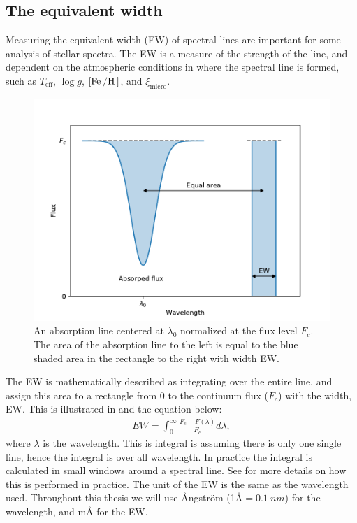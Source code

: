 \subsection{The equivalent width}

Measuring the equivalent width (EW) of spectral lines are important for some
analysis of stellar spectra. The EW is a measure of the strength of the line,
and dependent on the atmospheric conditions in where the spectral line is
formed, such as $T_\mathrm{eff}$, $\log g$, $[\ion{Fe}/\ion{H}]$, and
$\xi_\mathrm{micro}$.

\begin{figure}[htpb!]
    \centering
    \includegraphics[width=1.0\linewidth]{figures/ewTheoretical.pdf}
    \caption{An absorption line centered at $\lambda_0$ normalized at the flux
             level $F_c$. The area of the absorption line to the left is equal
             to the blue shaded area in the rectangle to the right with width
             EW.}
    \label{fig:ewTheoretical}
\end{figure}

The EW is mathematically described as integrating over the entire line, and
assign this area to a rectangle from 0 to the continuum flux ($F_c$) with the
width, EW. This is illustrated in  and the equation
below: \begin{align} EW = \int_{0}^{\infty} \frac{F_c-F(\lambda)}{F_c} d\lambda,
\end{align} where $\lambda$ is the wavelength. This is integral is assuming
there is only one single line, hence the integral is over all wavelength. In
practice the integral is calculated in small windows around a spectral line. See
 for more details on how this is performed in practice. The
unit of the EW is the same as the wavelength used. Throughout this thesis we
will use \AA{}ngstr\"{o}m (1\AA$=\SI{0.1}{nm}$) for the wavelength, and m\AA{}
for the EW.


